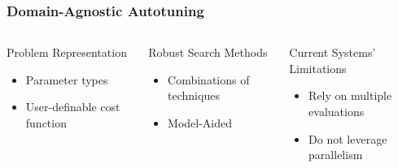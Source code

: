 \documentclass[10pt, compress, aspectratio=169]{beamer}
\begin{document}
\begin{frame}
    \frametitle{Domain-Agnostic Autotuning}
    \begin{columns}[c]
        \begin{block}{Problem Representation}
            \begin{itemize}
                \item Parameter \alert{types}
                \item \alert{User-definable cost function}
            \end{itemize}
        \end{block}

        \pause

        \begin{block}{Robust Search Methods}
            \begin{itemize}
                \item \alert{Combinations} of techniques
                \item \alert{Model-Aided}
            \end{itemize}
        \end{block}

        \pause

        \begin{block}{Current Systems' Limitations}
            \begin{itemize}
                \item Rely on \alert{multiple evaluations}
                \item \alert{Do not leverage parallelism}
            \end{itemize}
        \end{block}

    \end{columns}
\end{frame}
\end{document}
